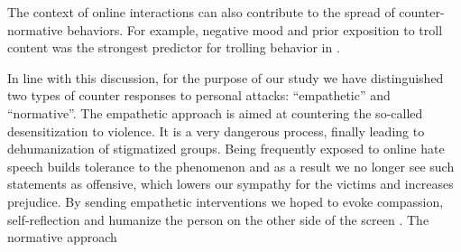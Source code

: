 \documentclass[preprint,12pt]{elsarticle}
\begin{document}
The context of online interactions can also contribute to the spread of counter-normative behaviors. For example, negative mood and prior exposition to troll content was the strongest predictor for trolling behavior in \citep{cheng2017anyone}.



 
 
 In line with this discussion, for the purpose of our study we have distinguished two types of counter responses to personal attacks: ``empathetic'' and ``normative''. The empathetic approach is aimed at countering the so-called desensitization to violence. It is a very dangerous process, finally leading to dehumanization of stigmatized groups. %
 Being frequently exposed to online hate speech builds tolerance to the phenomenon and as a result we no longer see such statements as offensive, which lowers our sympathy for the victims and increases prejudice. By sending empathetic interventions we hoped to evoke compassion, self-reflection and humanize the person on the other side of the screen \citep{bilewicz2021artificial}.  The normative approach 


\end{document}
